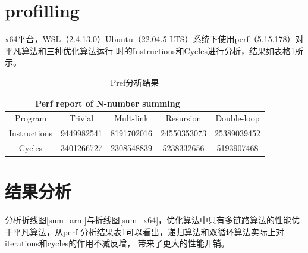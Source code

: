 \documentclass[12pt, a4paper, oneside]{ctexart}
\begin{document}
\section{profilling}
x64平台，WSL（2.4.13.0）Ubuntu（22.04.5 LTS）系统下使用perf（5.15.178）对平凡算法和三种优化算法运行
时的Instructions和Cycles进行分析，结果如表格\ref{sum_perf}所示。
\begin{table}
\centering
\begin{tabular}{c c c c c}
    \hline
    \multicolumn{4}{c}{Perf report of N-number summing} \\
    \hline
    \hline
    Program & Trivial & Mult-link & Resursion & Double-loop \\
    Instructions & 9449982541 & 8191702016 & 24550353073 & 25389039452 \\
    Cycles & 3401266727 & 2308548839 & 5238332656 & 5193907468 \\
    \hline
\end{tabular}
\caption{Pref分析结果}
\label{sum_perf}
\end{table}
\section{结果分析}
分析折线图\ref{sum_arm}与折线图\ref{sum_x64}，优化算法中只有多链路算法的性能优于平凡算法，从perf
分析结果表\ref{sum_perf}可以看出，递归算法和双循环算法实际上对iterations和cycles的作用不减反增，
带来了更大的性能开销。
\end{document}

